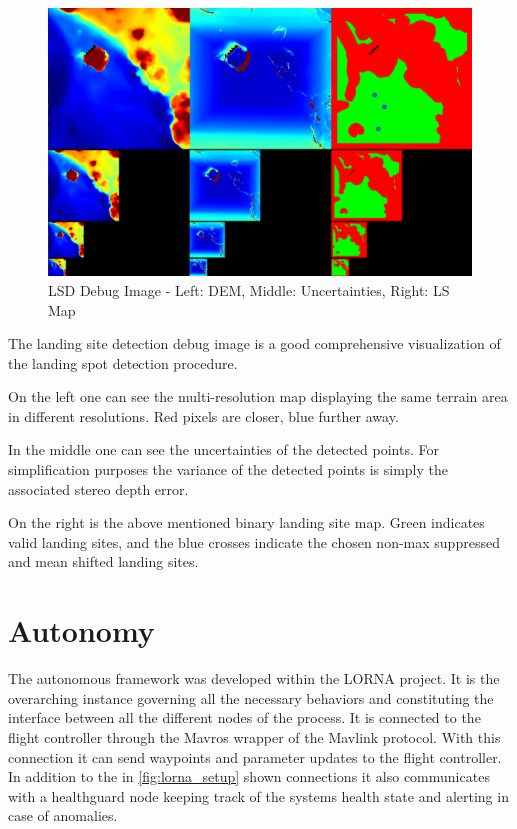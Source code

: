 \begin{figure}[ht!]
    \centering
    \includegraphics[scale=0.25]{images/setup/lsd_debug_image.png}
    \caption{LSD Debug Image - Left: DEM, Middle: Uncertainties, Right: LS Map}
    \label{fig:lsd_debug}
\end{figure}

The landing site detection debug image is a good comprehensive visualization of the landing spot detection procedure. 

On the left one can see the multi-resolution map displaying the same terrain area in different resolutions. Red pixels are closer, blue further away.

In the middle one can see the uncertainties of the detected points. For simplification purposes the variance of the detected points is simply the associated stereo depth error.

On the right is the above mentioned binary landing site map. Green indicates valid landing sites, and the blue crosses indicate the chosen non-max suppressed and mean shifted landing sites.

\section{Autonomy}\label{sec:setup:autonomy}

The autonomous framework was developed within the LORNA project. It is the overarching instance governing all the necessary behaviors and constituting the interface between all the different nodes of the process. It is connected to the flight controller through the Mavros wrapper of the Mavlink protocol. With this connection it can send waypoints and parameter updates to the flight controller.
In addition to the in \cref{fig:lorna_setup} shown connections it also communicates with a healthguard node keeping track of the systems health state and alerting in case of anomalies.

